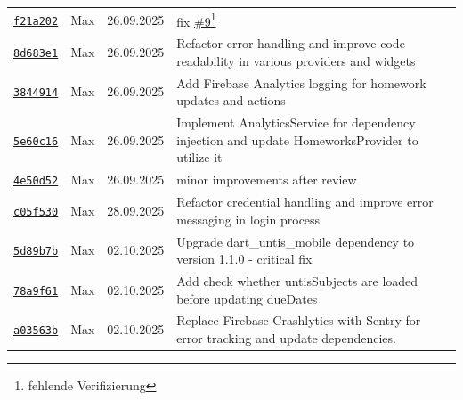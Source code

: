 \documentclass{article}%
\begin{document}
\begin{longtable}{l l l p{12cm}}
\href{https://github.com/scriptor1000/homeworks/pull/10/commits/f21a2026e63a78ed271f509d71c7b5a7352f7ee3}{\underline{\texttt{f21a202}}}&Max&26.09.2025&fix \href{https://github.com/scriptor1000/homeworks/issues/9}{\underline{\#9}}\footnote{fehlende Verifizierung}\\%
\href{https://github.com/scriptor1000/homeworks/pull/10/commits/8d683e121842f403ada151752e313e0de7e7aa2c}{\underline{\texttt{8d683e1}}}&Max&26.09.2025&Refactor error handling and improve code readability in various providers and widgets\\%
\href{https://github.com/scriptor1000/homeworks/pull/10/commits/384491441dcb2bfb58ca22ebf3d83ab082b8b84b}{\underline{\texttt{3844914}}}&Max&26.09.2025&Add Firebase Analytics logging for homework updates and actions\\%
\href{https://github.com/scriptor1000/homeworks/pull/10/commits/5e60c169de6fa951d1406402abc8c8e695d4a380}{\underline{\texttt{5e60c16}}}&Max&26.09.2025&Implement AnalyticsService for dependency injection and update HomeworksProvider to utilize it\\%
\href{https://github.com/scriptor1000/homeworks/pull/10/commits/4e50d524520e22bb5c7d4c39bd48530a99f8d61b}{\underline{\texttt{4e50d52}}}&Max&26.09.2025&minor improvements after review\\%
\href{https://github.com/scriptor1000/homeworks/pull/10/commits/c05f53026fa5343aeabca7adcafe7a591b02050f}{\underline{\texttt{c05f530}}}&Max&28.09.2025&Refactor credential handling and improve error messaging in login process\\%
\href{https://github.com/scriptor1000/homeworks/pull/10/commits/5d89b7b8e23ff93d273a2702fdd62cba97c6dd5c}{\underline{\texttt{5d89b7b}}}&Max&02.10.2025&Upgrade dart\_untis\_mobile dependency to version 1.1.0 {-} critical  fix\\%
\href{https://github.com/scriptor1000/homeworks/pull/10/commits/78a9f61808c85c713d9369c8101f2938780e92e8}{\underline{\texttt{78a9f61}}}&Max&02.10.2025&Add check whether untisSubjects are loaded before updating dueDates\\%
\href{https://github.com/scriptor1000/homeworks/pull/10/commits/a03563badaf9e2730a98b317f0851035c239bab8}{\underline{\texttt{a03563b}}}&Max&02.10.2025&Replace Firebase Crashlytics with Sentry for error tracking and update dependencies.\\%
\end{longtable}

%
\end{document}

